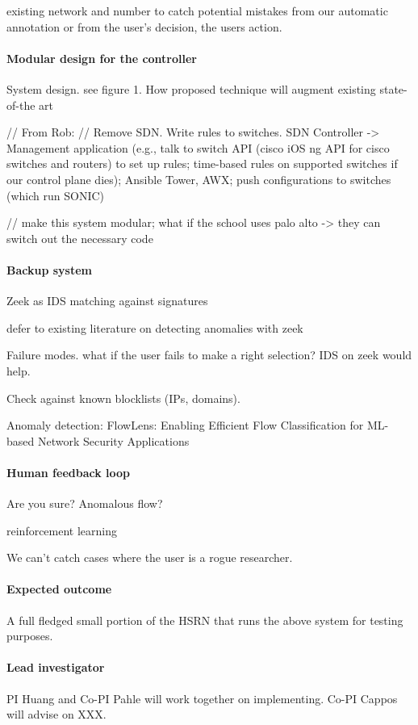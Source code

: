 existing network and number to catch potential mistakes from our automatic annotation or from the user's decision, the users action.








\paragraph{Modular design for the controller}

System design. see figure 1. How proposed technique will augment existing state-of-the art

// From Rob: // Remove SDN. Write rules to switches. SDN Controller -> Management application (e.g., talk to switch API (cisco iOS ng API for cisco switches and routers)  to set up rules; time-based rules on supported switches if our control plane dies); Ansible Tower, AWX; push configurations to switches (which run SONIC)

// make this system modular; what if the school uses palo alto -> they can switch out the necessary code




\paragraph{Backup system} Zeek as IDS
matching against signatures

defer to existing literature on detecting anomalies with zeek

Failure modes. what if the user fails to make a right selection? IDS on zeek would help.

Check against known blocklists (IPs, domains).


Anomaly detection:
FlowLens: Enabling Efficient Flow Classification for ML-based Network Security Applications




\paragraph{Human feedback loop}

Are you sure? Anomalous flow?

reinforcement learning



We can't catch cases where the user is a rogue researcher.


\paragraph{Expected outcome} A full fledged small portion of the HSRN that runs the above system for testing purposes.

\paragraph{Lead investigator} PI Huang and Co-PI Pahle will work together on implementing. Co-PI Cappos will advise on XXX.
